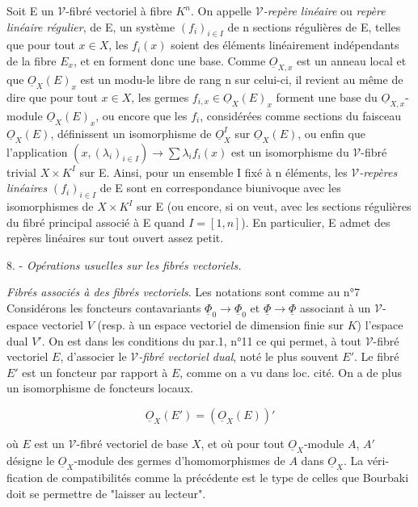 Soit E un $\mathcal{V}$-fibré vectoriel à fibre $K^n$. On appelle \emph{$\mathcal{V}$-repère linéaire} ou \emph{repère linéaire régulier}, de E, un système $(f_i)_{i \in I}$ de n sections régulières de E, telles que pour tout $x \in X$, les $f_i(x)$ soient des éléments linéairement indépendants de la fibre $E_x$, et en forment donc une base. Comme $\underline{O}_{X,x}$ est un anneau local et que $\underline{O}_X(E)_x$ est un modu-le libre de rang n sur celui-ci, il revient au même de dire que pour tout $x \in X$, les germes $f_{i,x} \in \underline{O}_X(E)_x$ forment une base du $\underline{O}_{X,x}$-module $\underline{O}_X(E)_x$, ou encore que les $f_i$, considérées comme sections du faisceau $\underline{O}_X(E)$, définissent un isomorphisme de $\underline{O}_X^I$ sur $\underline{O}_X(E)$, ou enfin que l'application $(x, (\lambda_i)_{i \in I}) \to \sum \lambda_i f_i(x)$ est un isomorphisme du $\mathcal{V}$-fibré trivial $X \times K^I$ sur E. Ainsi, pour un ensemble I fixé à n éléments, les \emph{$\mathcal{V}$-repères linéaires} $(f_i)_{i \in I}$ de E sont en correspondance biunivoque avec les isomorphismes de $X \times K^I$ sur E (ou encore, si on veut, avec les sections régulières du fibré principal associé à E quand $I=[1,n]$). En particulier, E admet des repères linéaires sur tout ouvert assez petit.

\newpage



8. - \emph{Opérations usuelles sur les fibrés vectoriels.}

\emph{Fibrés associés à des fibrés vectoriels}. Les notations sont comme au n°7
Considérons les foncteurs contavariants $\underline{\Phi}_0 \to \underline{\Phi}_0$ et $\underline{\Phi} \to \underline{\Phi}$ associant
à un $\mathcal{V}$-espace vectoriel $V$ (resp. à un espace vectoriel de dimension
finie sur $K$) l'espace dual $V'$. On est dans les conditions du par.1, n°11
ce qui permet, à tout $\mathcal{V}$-fibré vectoriel $E$, d'associer le \emph{$\mathcal{V}$-fibré
vectoriel dual}, noté le plus souvent $E'$. Le fibré $E'$ est un foncteur par
rapport à $E$, comme on a vu dans loc. cité. On a de plus un isomorphisme
de foncteurs locaux.

\[
\underline{O}_X(E') = (\underline{O}_X(E))'
\]

où $E$ est un $\mathcal{V}$-fibré vectoriel de base $X$, et où pour tout $\underline{O}_X$-module $A$,
$A'$ désigne le $\underline{O}_X$-module des germes d'homomorphismes de $A$ dans $\underline{O}_X$. La véri-
fication de compatibilités comme la précédente est le type de celles que
Bourbaki doit se permettre de "laisser au lecteur".

